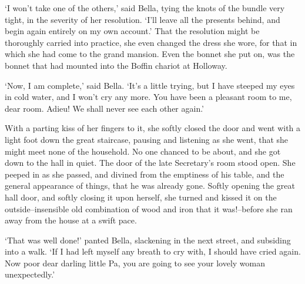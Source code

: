 ‘I won’t take one of the others,’ said Bella, tying the knots of the
bundle very tight, in the severity of her resolution. ‘I’ll leave all
the presents behind, and begin again entirely on my own account.’ That
the resolution might be thoroughly carried into practice, she even
changed the dress she wore, for that in which she had come to the grand
mansion. Even the bonnet she put on, was the bonnet that had mounted
into the Boffin chariot at Holloway.

‘Now, I am complete,’ said Bella. ‘It’s a little trying, but I have
steeped my eyes in cold water, and I won’t cry any more. You have been
a pleasant room to me, dear room. Adieu! We shall never see each other
again.’

With a parting kiss of her fingers to it, she softly closed the door and
went with a light foot down the great staircase, pausing and listening
as she went, that she might meet none of the household. No one chanced
to be about, and she got down to the hall in quiet. The door of the late
Secretary’s room stood open. She peeped in as she passed, and divined
from the emptiness of his table, and the general appearance of things,
that he was already gone. Softly opening the great hall door, and
softly closing it upon herself, she turned and kissed it on the
outside--insensible old combination of wood and iron that it
was!--before she ran away from the house at a swift pace.

‘That was well done!’ panted Bella, slackening in the next street, and
subsiding into a walk. ‘If I had left myself any breath to cry with, I
should have cried again. Now poor dear darling little Pa, you are going
to see your lovely woman unexpectedly.’



